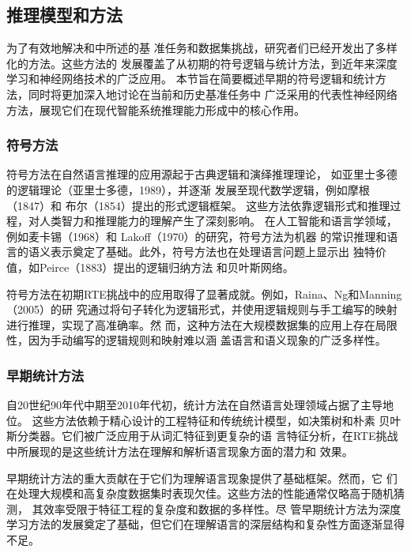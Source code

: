 \subsection{推理模型和方法}
\label{sec1:approachs}
为了有效地解决和中所述的基
准任务和数据集挑战，研究者们已经开发出了多样化的方法。这些方法的
发展覆盖了从初期的符号逻辑与统计方法，到近年来深度学习和神经网络技术的广泛应用。
本节旨在简要概述早期的符号逻辑和统计方法，同时将更加深入地讨论在当前和历史基准任务中
广泛采用的代表性神经网络方法，展现它们在现代智能系统推理能力形成中的核心作用。

\subsubsection{符号方法}
符号方法在自然语言推理的应用源起于古典逻辑和演绎推理理论，
如亚里士多德的逻辑理论（亚里士多德，1989）\cite{smith1989prior}，并逐渐
发展至现代数学逻辑，例如摩根（1847）\cite{de1847formal}和
布尔（1854）\cite{boole1854investigation}提出的形式逻辑框架。
这些方法依靠逻辑形式和推理过程，对人类智力和推理能力的理解产生了深刻影响。
在人工智能和语言学领域，例如麦卡锡（1968）\cite{mccarthy1959programs}和
Lakoff（1970）\cite{lakoff1970linguistics}的研究，符号方法为机器
的常识推理和语言的语义表示奠定了基础。此外，符号方法也在处理语言问题上显示出
独特价值，如Peirce（1883）\cite{peirce1883theory}提出的逻辑归纳方法
和贝叶斯网络\cite{dechter2013reasoning}。

符号方法在初期RTE挑战中的应用取得了显著成就。例如，Raina、Ng和Manning（2005）\cite{raina2005robust}的研
究通过将句子转化为逻辑形式，并使用逻辑规则与手工编写的映射进行推理，实现了高准确率。然
而，这种方法在大规模数据集的应用上存在局限性，因为手动编写的逻辑规则和映射难以涵
盖语言和语义现象的广泛多样性\cite{kamath2018survey}。

\subsubsection{早期统计方法}
自20世纪90年代中期至2010年代初，统计方法在自然语言处理领域占据了主导地位。
这些方法依赖于精心设计的工程特征和传统统计模型，如决策树\cite{ng2000machine}和朴素
贝叶斯分类器\cite{glickman2006applied}。它们被广泛应用于从词汇特征到更复杂的语
言特征分析，在RTE挑战中所展现的是这些统计方法在理解和解析语言现象方面的潜力和
效果\cite{dagan2005pascal,haim2006second}。

早期统计方法的重大贡献在于它们为理解语言现象提供了基础框架。然而，它
们在处理大规模和高复杂度数据集时表现欠佳。这些方法的性能通常仅略高于随机猜测，
其效率受限于特征工程的复杂度和数据的多样性\cite{haim2006second,lai2014illinois}。尽
管早期统计方法为深度学习方法的发展奠定了基础，但它们在理解语言的深层结构和复杂性方面逐渐显得不足。

